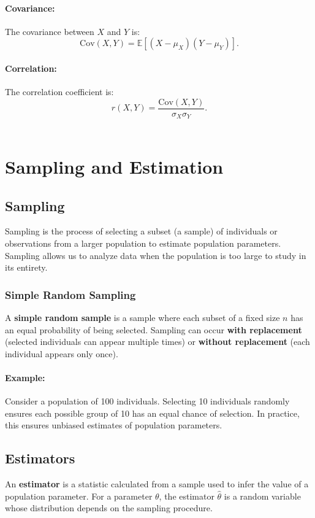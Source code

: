 \documentclass[12pt,a4paper]{article}
\begin{document}
\paragraph{Covariance:} The covariance between \(X\) and \(Y\) is:
\[
\text{Cov}(X, Y) = \mathbb{E}[(X - \mu_X)(Y - \mu_Y)].
\]

\paragraph{Correlation:} The correlation coefficient is:
\[
r(X, Y) = \frac{\text{Cov}(X, Y)}{\sigma_X \sigma_Y}.
\]
\



\section{Sampling and Estimation}

\subsection{Sampling}
Sampling is the process of selecting a subset (a sample) of individuals or observations from a larger population to estimate population parameters. Sampling allows us to analyze data when the population is too large to study in its entirety.

\subsubsection*{Simple Random Sampling}
A \textbf{simple random sample} is a sample where each subset of a fixed size $n$ has an equal probability of being selected. Sampling can occur \textbf{with replacement} (selected individuals can appear multiple times) or \textbf{without replacement} (each individual appears only once).

\paragraph{Example:}
Consider a population of 100 individuals. Selecting 10 individuals randomly ensures each possible group of 10 has an equal chance of selection. In practice, this ensures unbiased estimates of population parameters.

\subsection{Estimators}
An \textbf{estimator} is a statistic calculated from a sample used to infer the value of a population parameter. For a parameter $\theta$, the estimator $\hat{\theta}$ is a random variable whose distribution depends on the sampling procedure.
\end{document}
